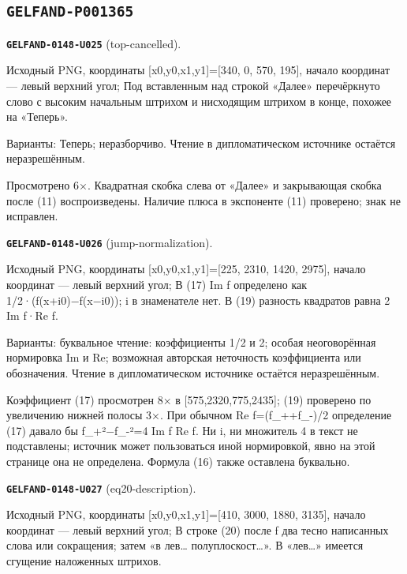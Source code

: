 \documentclass[11pt]{article}
\theoremstyle{definition}
\theoremstyle{remark}
\begin{document}
\subsection*{\texttt{GELFAND-P001365}}
\noindent\leavevmode{}\label{GELFAND-P001365:top-cancelled:note}\textbf{\texttt{GELFAND-0148-U025}} (top-cancelled).\par\nopagebreak[4]
Исходный PNG, координаты [x0,y0,x1,y1]=[340, 0, 570, 195], начало координат — левый верхний угол; Под вставленным над строкой «Далее» перечёркнуто слово с высоким начальным штрихом и нисходящим штрихом в конце, похожее на «Теперь».\par
Варианты: Теперь; неразборчиво. Чтение в дипломатическом источнике остаётся неразрешённым.\par
Просмотрено 6×. Квадратная скобка слева от «Далее» и закрывающая скобка после (11) воспроизведены. Наличие плюса в экспоненте (11) проверено; знак не исправлен.\par\medskip
\noindent\leavevmode{}\label{GELFAND-P001365:jump-normalization:note}\textbf{\texttt{GELFAND-0148-U026}} (jump-normalization).\par\nopagebreak[4]
Исходный PNG, координаты [x0,y0,x1,y1]=[225, 2310, 1420, 2975], начало координат — левый верхний угол; В (17) Im f определено как 1/2·(f(x+i0)−f(x−i0)); i в знаменателе нет. В (19) разность квадратов равна 2 Im f·Re f.\par
Варианты: буквальное чтение: коэффициенты 1/2 и 2; особая неоговорённая нормировка Im и Re; возможная авторская неточность коэффициента или обозначения. Чтение в дипломатическом источнике остаётся неразрешённым.\par
Коэффициент (17) просмотрен 8× в [575,2320,775,2435]; (19) проверено по увеличению нижней полосы 3×. При обычном Re f=(f\_++f\_-)/2 определение (17) давало бы f\_+²−f\_-²=4 Im f Re f. Ни i, ни множитель 4 в текст не подставлены; источник может пользоваться иной нормировкой, явно на этой странице она не определена. Формула (16) также оставлена буквально.\par\medskip
\noindent\leavevmode{}\label{GELFAND-P001365:eq20-description:note}\textbf{\texttt{GELFAND-0148-U027}} (eq20-description).\par\nopagebreak[4]
Исходный PNG, координаты [x0,y0,x1,y1]=[410, 3000, 1880, 3135], начало координат — левый верхний угол; В строке (20) после f два тесно написанных слова или сокращения; затем «в лев… полуплоскост…». В «лев…» имеется сгущение наложенных штрихов.\par
\end{document}
